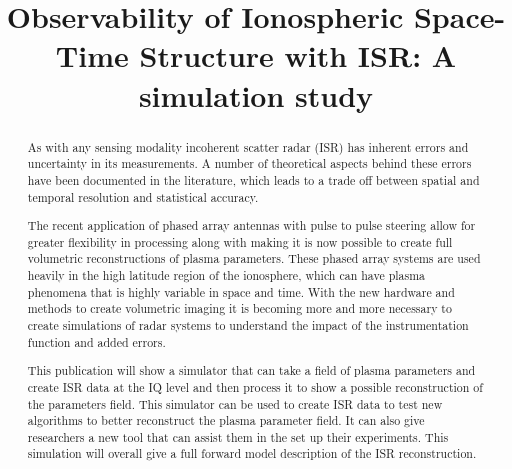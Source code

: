 \documentclass[draft,ras]{agutex}
\begin{document}
%
%


\title{Observability of Ionospheric Space-Time Structure with ISR:   A simulation study }

%
%


\begin{abstract}
As with any sensing modality incoherent scatter radar (ISR) has inherent errors and uncertainty in its measurements. A number of theoretical aspects behind these errors have been documented in the literature, which leads to a trade off between spatial and temporal resolution and statistical accuracy. 

The recent application of phased array antennas with pulse to pulse steering allow for greater flexibility in processing along with making it is now possible to create full volumetric reconstructions of plasma parameters. These phased array systems are used heavily in the high latitude region of the ionosphere, which can have plasma phenomena that is highly variable in space and time. With the new hardware and methods to create volumetric imaging it is becoming more and more necessary to create simulations of radar systems to understand the impact of the instrumentation function and added errors. 

This publication will show a simulator that can take a field of plasma parameters and create ISR data at the IQ level and then process it to show a possible reconstruction of the parameters field. This simulator can be used to create ISR data to test new algorithms to better reconstruct the plasma parameter field. It can also give researchers a new tool that can assist them in the set up their experiments. This simulation will overall give a full forward model description of the ISR reconstruction.
\end{abstract}
\end{document}
